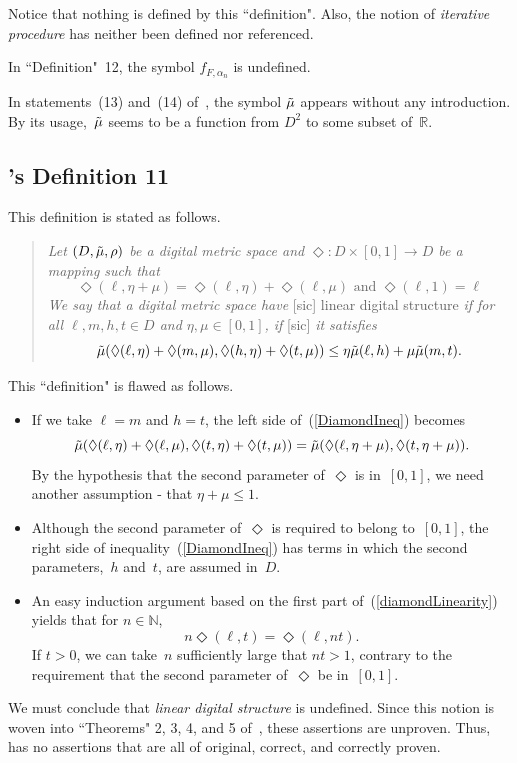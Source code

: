 \documentclass{article}
\numberwithin{thm}{section}
\def\N{{\mathbb N}}
\def\R{{\mathbb R}}
\begin{document}
Notice that nothing is defined
by this ``definition". Also, 
the notion of {\em iterative
procedure} has neither been 
defined nor referenced.

In ``Definition"~12, the symbol
$f_{F,\alpha_n}$ is undefined.

In statements~(13) and~(14)
of~\cite{ShaheenEtAl}, the
symbol $\Tilde{\mu}$ appears
without any introduction.
By its usage,~$\Tilde{\mu}$
seems to be a function from
$D^2$ to some subset of~$\R$.

\subsection{\cite{ShaheenEtAl}'s Definition 11}
This definition is stated as
follows.
\begin{quote}
    {\em Let $(D,\Tilde{\mu},\rho)$
    be a digital metric space 
    and $\Diamond: D \times [0,1] \to D$ be a mapping such that
    \begin{equation} 
    \label{diamondLinearity}
    \Diamond(\ell, \eta + \mu) = \Diamond(\ell, \eta) 
    + \Diamond(\ell, \mu) \mbox{ and } \Diamond(\ell, 1) = \ell 
    \end{equation}
    We say that a digital metric space have} [sic]
    linear digital structure
    {\em if for all $\ell,m,h,t \in D$ and $\eta,\mu \in [0,1]$,
    if} [sic] {\em it satisfies}
    \begin{equation}
    \label{DiamondIneq}
    \Tilde{\mu}(\Diamond(\ell,\eta) +
    \Diamond(m,\mu),
    \Diamond(h,\eta) +
    \Diamond(t,\mu)) \le
    \eta \Tilde{\mu}(\ell,h) +
      \mu \Tilde{\mu}(m,t).
    \end{equation}
\end{quote}

This ``definition" is flawed
as follows.
\begin{itemize}
\item If we take $\ell = m$
      and $h=t$, the left side
      of~(\ref{DiamondIneq})
      becomes
\[ \Tilde{\mu}(\Diamond(\ell,\eta) +
    \Diamond(\ell,\mu),
    \Diamond(t,\eta) +
    \Diamond(t,\mu)) =
    \Tilde{\mu}(\Diamond(\ell,\eta + \mu), \Diamond(t,\eta + \mu)).
\]
By the hypothesis that the
second parameter of~$\Diamond$
is in~$[0,1]$, we need
another assumption - that
$\eta + \mu \le 1$.
\item Although the second parameter of~$\Diamond$ is required to belong
to~$[0,1]$, the right side of
inequality~(\ref{DiamondIneq})
has terms in which the second
parameters,~$h$ and~$t$, are
assumed in~$D$. 
\item An easy induction argument
based on the first part 
of~(\ref{diamondLinearity})
yields that for $n \in \N$,
\[ n \Diamond(\ell,t) =
   \Diamond(\ell, nt).
\]
If $t > 0$, we can take~$n$
sufficiently large that $nt > 1$, contrary to the requirement
that the second parameter 
of~$\Diamond$ be in~$[0,1]$.
\end{itemize}
We must conclude that
{\em linear digital structure}
is undefined. Since this notion
is woven into ``Theorems" 2, 3,
4, and 5
of~\cite{ShaheenEtAl}, these
assertions are unproven. Thus,
\cite{ShaheenEtAl}
has no assertions
that are all of original, correct,
and correctly proven.
\end{document}
